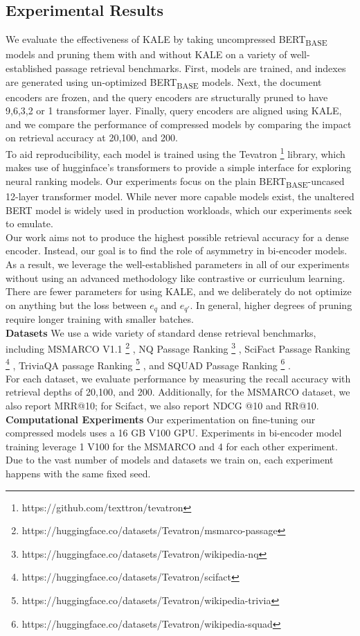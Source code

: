 \subsection{Experimental Results}
We evaluate the effectiveness of KALE by taking uncompressed BERT\textsubscript{BASE} models and pruning them with and without KALE on a variety of well-established passage retrieval benchmarks. First, models are trained, and indexes are generated using un-optimized BERT\textsubscript{BASE} models. Next, the document encoders are frozen, and the query encoders are structurally pruned to have 9,6,3,2 or 1 transformer layer. Finally, query encoders are aligned using KALE, and we compare the performance of compressed models by comparing the impact on retrieval accuracy at 20,100, and 200. \\
To aid reproducibility, each model is trained using the Tevatron \cite{Gao2022TevatronAE} \footnote{https://github.com/texttron/tevatron} library, which makes use of hugginface's transformers to provide a simple interface for exploring neural ranking models. Our experiments focus on the plain BERT\textsubscript{BASE}-uncased 12-layer transformer model. While never more capable models exist, the unaltered BERT model is widely used in production workloads, which our experiments seek to emulate. \\
Our work aims not to produce the highest possible retrieval accuracy for a dense encoder. Instead, our goal is to find the role of asymmetry in bi-encoder models. As a result, we leverage the well-established parameters in all of our experiments without using an advanced methodology like contrastive or curriculum learning. \\
There are fewer parameters for using KALE, and we deliberately do not optimize on anything but the loss between $e_{q}$ and $e_{q'}$. In general, higher degrees of pruning require longer training with smaller batches. \\ 
\textbf{Datasets} We use a wide variety of standard dense retrieval benchmarks, including MSMARCO V1.1 \footnote{https://huggingface.co/datasets/Tevatron/msmarco-passage} \cite{Campos2016MSMA}, NQ Passage Ranking \footnote{https://huggingface.co/datasets/Tevatron/wikipedia-nq} \cite{Kwiatkowski2019NaturalQA}, SciFact Passage Ranking \footnote{https://huggingface.co/datasets/Tevatron/scifact} \cite{Wadden2020FactOF}, TriviaQA passage Ranking \footnote{https://huggingface.co/datasets/Tevatron/wikipedia-trivia} \cite{Joshi2017TriviaQAAL}, and SQUAD Passage Ranking \footnote{https://huggingface.co/datasets/Tevatron/wikipedia-squad} \cite{Rajpurkar2016SQuAD10}. \\
For each dataset, we evaluate performance by measuring the recall accuracy with retrieval depths of 20,100, and 200. Additionally, for the MSMARCO dataset, we also report MRR@10; for Scifact, we also report NDCG @10 and RR@10. \\
\textbf{Computational Experiments}
Our experimentation on fine-tuning our compressed models uses a 16 GB V100 GPU. Experiments in bi-encoder model training leverage 1 V100 for the MSMARCO and 4 for each other experiment. Due to the vast number of models and datasets we train on, each experiment happens with the same fixed seed.  
